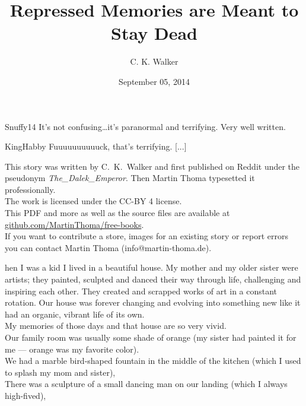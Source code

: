 \documentclass[a5paper]{scrartcl}
\title{Repressed Memories are Meant to Stay Dead}
\author{C. K. Walker}
\date{September 05, 2014}
\begin{document}
\maketitle

\begin{shadequote}[l]{Snuffy14}
It's not confusing\dots it's paranormal and terrifying. Very well written.
\end{shadequote}

\begin{shadequote}[l]{KingHabby}
Fuuuuuuuuuuck, that's terrifying. [...]
\end{shadequote}
\clearpage

This story was written by C.~K.~Walker and first published on Reddit under the
pseudonym \textit{The\_Dalek\_Emperor}. Then
Martin Thoma typesetted it professionally.\\

The work is licensed under the CC-BY 4 license.\\

This PDF and more as well as the source files are available at
\url{github.com/MartinThoma/free-books}.\\

If you want to contribute a store, images for an existing story or report
errors you can contact Martin Thoma (info@martin-thoma.de).

\clearpage

hen I was a kid I lived in a beautiful house. My mother and my older sister were artists; they painted, sculpted and danced their way through life, challenging and inspiring each other. They created and scrapped works of art in a constant rotation. Our house was forever changing and evolving into something new like it had an organic, vibrant life of its own. \\


My memories of those days and that house are so very vivid. \\


Our family room was usually some shade of orange (my sister had painted it for me --- orange was my favorite color).\\


We had a marble bird-shaped fountain in the middle of the kitchen (which I used to splash my mom and sister),\\


There was a sculpture of a small dancing man on our landing (which I always high-fived), \\
\end{document}
